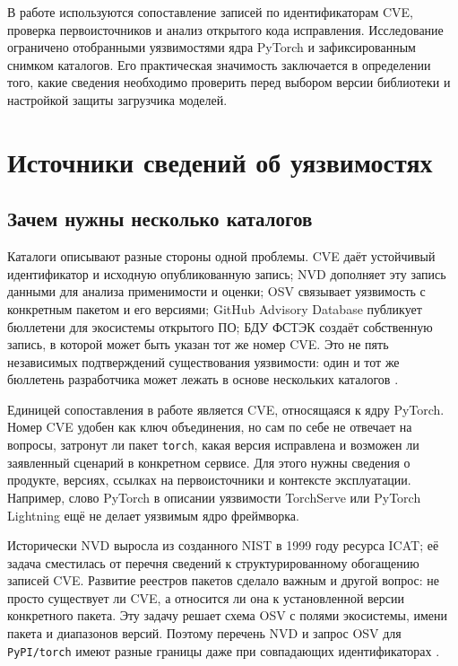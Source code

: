 \documentclass[12pt,a4paper]{report}
\begin{document}
В работе используются сопоставление записей по идентификаторам CVE, проверка первоисточников и анализ открытого кода исправления. Исследование ограничено отобранными уязвимостями ядра PyTorch и зафиксированным снимком каталогов. Его практическая значимость заключается в определении того, какие сведения необходимо проверить перед выбором версии библиотеки и настройкой защиты загрузчика моделей.

\chapter{Источники сведений об уязвимостях}

\section{Зачем нужны несколько каталогов}

Каталоги описывают разные стороны одной проблемы. CVE даёт устойчивый идентификатор и исходную опубликованную запись; NVD дополняет эту запись данными для анализа применимости и оценки; OSV связывает уязвимость с конкретным пакетом и его версиями; GitHub Advisory Database публикует бюллетени для экосистемы открытого ПО; БДУ ФСТЭК создаёт собственную запись, в которой может быть указан тот же номер CVE. Это не пять независимых подтверждений существования уязвимости: один и тот же бюллетень разработчика может лежать в основе нескольких каталогов \cite{cve,nvdgeneral,osvschema,ghsadocs,bdu}.

Единицей сопоставления в работе является CVE, относящаяся к ядру PyTorch. Номер CVE удобен как ключ объединения, но сам по себе не отвечает на вопросы, затронут ли пакет \texttt{torch}, какая версия исправлена и возможен ли заявленный сценарий в конкретном сервисе. Для этого нужны сведения о продукте, версиях, ссылках на первоисточники и контексте эксплуатации. Например, слово PyTorch в описании уязвимости TorchServe или PyTorch Lightning ещё не делает уязвимым ядро фреймворка.

Исторически NVD выросла из созданного NIST в 1999 году ресурса ICAT; её задача сместилась от перечня сведений к структурированному обогащению записей CVE. Развитие реестров пакетов сделало важным и другой вопрос: не просто существует ли CVE, а относится ли она к установленной версии конкретного пакета. Эту задачу решает схема OSV с полями экосистемы, имени пакета и диапазонов версий. Поэтому перечень NVD и запрос OSV для \texttt{PyPI/torch} имеют разные границы даже при совпадающих идентификаторах \cite{nvdgeneral,osvschema}.
\end{document}

